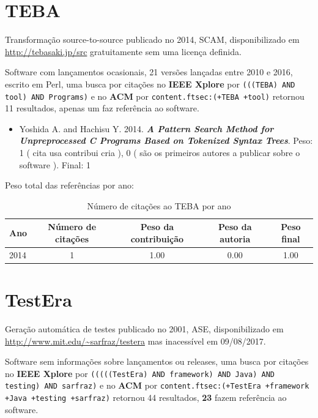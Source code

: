 \section{TEBA}

Transformação source-to-source
publicado no 2014, SCAM,
disponibilizado em \url{http://tebasaki.jp/src}
gratuitamente
sem uma licença definida.

Software com lançamentos ocasionais,
21 versões lançadas
entre 2010 e 2016,
escrito em Perl,
uma busca por citações no {\bf IEEE Xplore} por
\texttt{(((TEBA) AND tool) AND Programs)}
e no {\bf ACM} por
\texttt{content.ftsec:(+TEBA +tool)}
retornou
11 resultados,
apenas um faz referência ao software.

\begin{itemize}
\item Yoshida A. and Hachisu Y.
      2014.
        \textbf{\textit{ A Pattern Search Method for Unpreprocessed C Programs Based on Tokenized Syntax Trees}}.
      Peso:
      1 (
          cita
          usa
          contribui
          cria
      ),
      0 (
são os primeiros autores a publicar sobre o software
      ).
      Final:
      1

\end{itemize}

Peso total das referências por ano:

\begin{table}[h]
\caption{Número de citações ao TEBA por ano}
\centering
\begin{tabular}{| l | c | c | c | c |}
  \hline
  Ano & Número de citações & Peso da contribuição & Peso da autoria & Peso final \\
  \hline
  2014
    & 1
    & 1.00
    & 0.00
    & 1.00 \\
  \hline
\end{tabular}
\end{table}


\section{TestEra}

Geração automática de testes
publicado no 2001, ASE,
disponibilizado em \url{http://www.mit.edu/~sarfraz/testera}
mas inacessível em 09/08/2017.

Software sem informações sobre lançamentos ou releases,
uma busca por citações no {\bf IEEE Xplore} por
\texttt{(((((TestEra) AND framework) AND Java) AND testing) AND sarfraz)}
e no {\bf ACM} por
\texttt{content.ftsec:(+TestEra +framework +Java +testing +sarfraz)}
retornou
44 resultados,
{\bf 23} fazem referência ao software.

